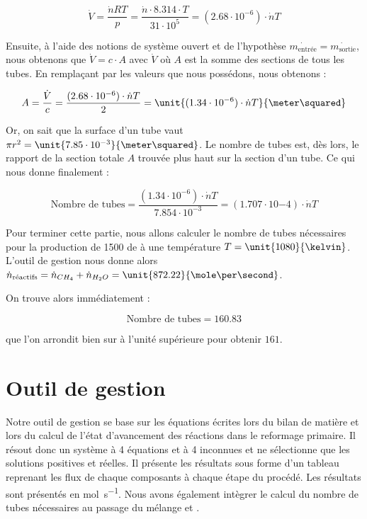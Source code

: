 $$\dot{V} = \frac{\dot{n}RT}{p} = \frac{\dot{n}\cdot 8.314\cdot T}{31\cdot10^5}
 = (2.68\cdot10^{-6})\cdot \dot{n}T$$

Ensuite, à l'aide des notions de système ouvert et de l'hypothèse 
$\dot{m_{\text{entrée}}} = \dot{m_{\text{sortie}}}$, nous obtenons que $\dot{V} 
= c \cdot  A $ avec $ \dot{V}$ où $A$ est la somme des sections de tous les tubes.
En remplaçant par les valeurs que nous possédons, nous obtenons :

$$A = \frac{\dot{V}}{c} = \frac{(2.68\cdot10^{-6})\cdot \dot{n}T}{2} 
= \unit{(1.34\cdot10^{-6})\cdot \dot{n}T}{\meter\squared}$$

Or, on sait que la surface d'un tube vaut $\pi r^2
= \unit{7.85\cdot10^{-3}}{\meter\squared}$. Le nombre de tubes est,
dès lors, le rapport de la section totale $A$ trouvée plus haut sur
la section d'un tube. Ce qui nous donne finalement : 

$$\text{Nombre de tubes} = \frac{(1.34\cdot10^{-6})\cdot \dot{n}T}{7.854\cdot10^{-3}}
= (1.707\cdot10{-4})\cdot\dot{n}T$$

Pour terminer cette partie, nous allons calculer le nombre de tubes
nécessaires pour la production de \unit{1500}{\ton\per\dday} de 
à une température $T = \unit{1080}{\kelvin}$. L'outil de gestion
nous donne alors $\dot{n}_{\text{réactifs}} = \dot{n}_{CH_4} + \dot{n}_{H_2O} 
= \unit{872.22}{\mole\per\second}$.

On trouve alors immédiatement :

$$\text{Nombre de tubes} = 160.83$$

que l'on arrondit bien sur à l'unité supérieure pour obtenir $161$.

\section{Outil de gestion}
Notre outil de gestion se base sur les équations écrites lors du
bilan de matière et lors du calcul de l'état d'avancement des réactions
dans le reformage primaire. Il résout donc un système à 4 équations
et à 4 inconnues et ne sélectionne que les solutions positives et réelles.
Il présente les résultats sous forme d'un tableau reprenant les flux de chaque
composants à chaque étape du procédé. Les résultats sont présentés en \unit{\mole\per\second}.
Nous avons également intègrer le calcul du nombre de tubes nécessaires au 
passage du mélange  et .

